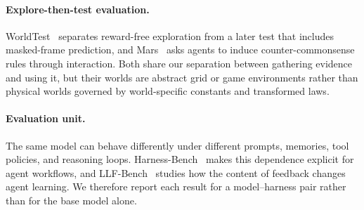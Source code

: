 \paragraph{Explore-then-test evaluation.} WorldTest~\cite{worldtest} separates reward-free exploration from a later test that includes masked-frame prediction, and Mars~\cite{mars} asks agents to induce counter-commonsense rules through interaction. Both share our separation between gathering evidence and using it, but their worlds are abstract grid or game environments rather than physical worlds governed by world-specific constants and transformed laws.

\paragraph{Evaluation unit.} The same model can behave differently under different prompts, memories, tool policies, and reasoning loops. Harness-Bench~\cite{harnessbench} makes this dependence explicit for agent workflows, and LLF-Bench~\cite{llfbench} studies how the content of feedback changes agent learning. We therefore report each result for a model--harness pair rather than for the base model alone.

